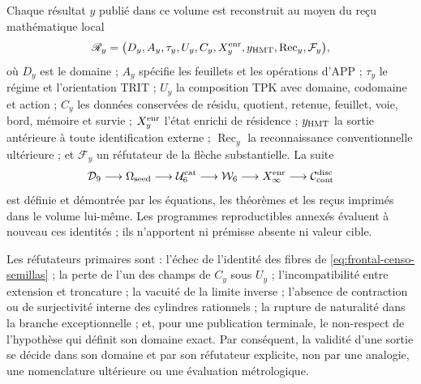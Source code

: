 \begin{proposition}
\label{prop:frontal-autosuficiencia-probatoria}
Chaque résultat \(y\) publié dans ce volume est reconstruit au moyen du
reçu mathématique local
\[
 \mathscr R_y=
 \bigl(D_y,A_y,\tau_y,U_y,C_y,X_y^{\rm enr},
       y_{\rm HMT},\operatorname{Rec}_y,\mathcal F_y\bigr),
\]
où \(D_y\) est le domaine ; \(A_y\) spécifie les feuillets et les opérations
d'APP ; \(\tau_y\) le régime et l'orientation TRIT ; \(U_y\) la composition TPK
avec domaine, codomaine et action ; \(C_y\) les données conservées de résidu,
quotient, retenue, feuillet, voie, bord, mémoire et survie ;
\(X_y^{\rm enr}\) l'état enrichi de résidence ; \(y_{\rm HMT}\) la
sortie antérieure à toute identification externe ; \(\operatorname{Rec}_y\) la
reconnaissance conventionnelle ultérieure ; et \(\mathcal F_y\) un réfutateur de la
flèche substantielle. La suite
\[
 \mathcal D_9\longrightarrow\Omega_{\rm seed}
 \longrightarrow\mathcal U_6^{\rm cat}
 \longrightarrow\mathcal W_6
 \longrightarrow X_\infty^{\rm enr}
 \longrightarrow\mathcal C_{\rm cont}^{\rm disc}
\]
est définie et démontrée par les équations, les théorèmes et les reçus imprimés
dans le volume lui-même. Les programmes reproductibles annexés évaluent à nouveau
ces identités ; ils n'apportent ni prémisse absente ni valeur cible.

Les réfutateurs primaires sont : l'échec de l'identité des fibres de
\eqref{eq:frontal-censo-semillas} ; la perte de l'un des champs de
\(C_y\) sous \(U_y\) ; l'incompatibilité entre extension et troncature ;
la vacuité de la limite inverse ; l'absence de contraction ou de surjectivité interne
des cylindres rationnels ; la rupture de naturalité dans la branche
exceptionnelle ; et, pour une publication terminale, le non-respect de
l'hypothèse qui définit son domaine exact. Par conséquent, la validité d'une
sortie se décide dans son domaine et par son réfutateur explicite, non par une
analogie, une nomenclature ultérieure ou une évaluation métrologique.
\end{proposition}


